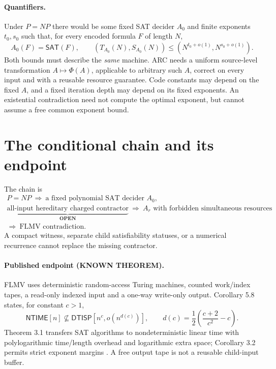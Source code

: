 \documentclass[11pt]{article}
\newcommand{\SAT}{\mathsf{SAT}}
\newcommand{\DTISP}{\mathsf{DTISP}}
\newcommand{\NTIME}{\mathsf{NTIME}}
\newcommand{\OPEN}{\textbf{OPEN}}
\newcommand{\KNOWN}{\textbf{KNOWN THEOREM}}
\begin{document}
\paragraph{Quantifiers.}
Under $P=NP$ there would be some fixed SAT decider $A_0$ and finite exponents
$t_0,s_0$ such that, for every encoded formula $F$ of length $N$,
\[
 A_0(F)=\SAT(F),\qquad
 (T_{A_0}(N),S_{A_0}(N))
 \le (N^{t_0+o(1)},N^{s_0+o(1)}).
\]
Both bounds must describe the \emph{same} machine.
ARC needs a uniform source-level transformation $A\mapsto\Phi(A)$,
applicable to arbitrary such $A$, correct on every input and with a
reusable resource guarantee. Code constants may depend on the fixed $A$,
and a fixed iteration depth may depend on its fixed exponents.
An existential contradiction need not compute the optimal exponent,
but cannot assume a free common exponent bound.

\section{The conditional chain and its endpoint}
The chain is
\[
\begin{gathered}
P=NP\ \Longrightarrow\ \text{a fixed polynomial SAT decider }A_0,\\
\underbrace{\text{all-input hereditary charged contractor}}_{\OPEN}
\ \Longrightarrow\ A_r\text{ with forbidden simultaneous resources}\\
\Longrightarrow\ \text{FLMV contradiction}.
\end{gathered}
\]
A compact witness, separate child satisfiability statuses, or a numerical
recurrence cannot replace the missing contractor.

\paragraph{Published endpoint (\KNOWN).}
FLMV uses deterministic random-access Turing machines, counted work/index
tapes, a read-only indexed input and a one-way write-only output.
Corollary 5.8 states, for constant $c>1$,
\[
 \NTIME[n]\not\subseteq\DTISP[n^c,o(n^{d(c)})],
 \qquad d(c)=\frac12\left(\frac{c+2}{c^2}-c\right).
\]
Theorem 3.1 transfers SAT algorithms to nondeterministic linear time with
polylogarithmic time/length overhead and logarithmic extra space; Corollary
3.2 permits strict exponent margins \cite{flmv}. A free output tape is
not a reusable child-input buffer.
\end{document}
